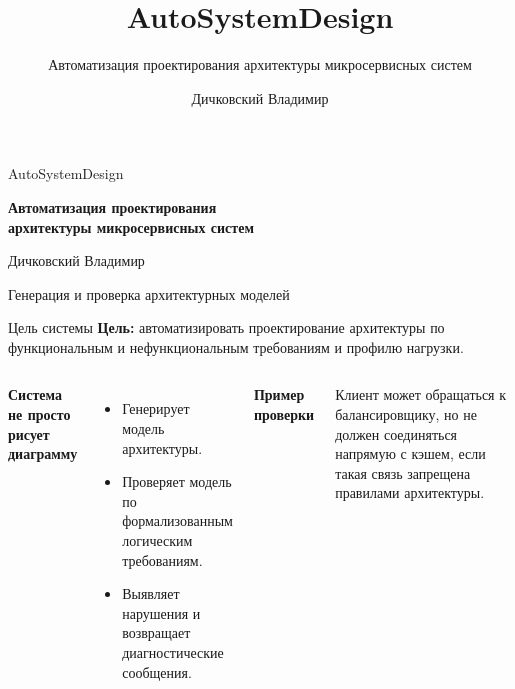 \documentclass[aspectratio=169,10pt]{beamer}
\title{AutoSystemDesign}
\subtitle{Автоматизация проектирования архитектуры микросервисных систем}
\author{Дичковский Владимир}
\date{}
\newcommand{\sectionlabel}[1]{{\color{Accent}\scriptsize\bfseries #1}\par\vspace{5pt}}
\begin{document}
\begin{frame}[plain]

\vspace{1.8cm}
{\color{Accent}\large AutoSystemDesign\par}
\vspace{0.5cm}
{\LARGE\bfseries Автоматизация проектирования\\[3pt]архитектуры микросервисных систем\par}
\vspace{0.8cm}
{\large Дичковский Владимир\par}
\vfill
{\color{Muted}\small Генерация и проверка архитектурных моделей}
\end{frame}

\begin{frame}{Цель системы}
\vspace{0.2cm}
\textbf{Цель:} автоматизировать проектирование архитектуры по функциональным и нефункциональным требованиям и профилю нагрузки.
\vspace{0.3cm}
\begin{columns}[T,onlytextwidth]
\sectionlabel{Система не просто рисует диаграмму}
\begin{itemize}
\item Генерирует модель архитектуры.
\item Проверяет модель по формализованным логическим требованиям.
\item Выявляет нарушения и возвращает диагностические сообщения.
\end{itemize}
\sectionlabel{Пример проверки}
Клиент может обращаться к балансировщику, но не должен соединяться напрямую с кэшем, если такая связь запрещена правилами архитектуры.
\end{columns}
\end{frame}
\end{document}
